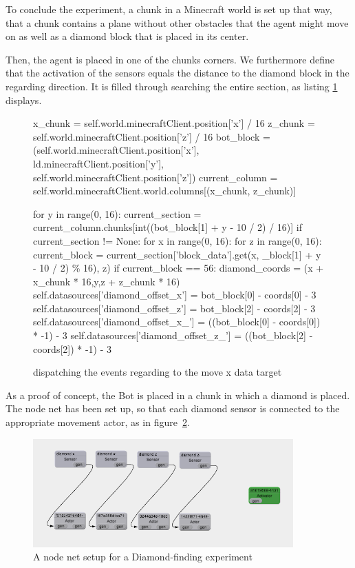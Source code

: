 To conclude the experiment, a chunk in a Minecraft world is set up that way, that a chunk contains a plane without other obstacles that the agent might move on as well as a diamond block that is placed in its center. 

Then, the agent is placed in one of the chunks corners. We furthermore define that the activation of the sensors equals the distance to the diamond block in the regarding direction. It is filled through searching the entire section, as listing \ref{listing_sensors} displays.

		\begin{figure}[ht]
			\centering
			\begin{minipage}{15cm}
				\begin{pseudocode}
x_chunk = self.world.minecraftClient.position['x'] / 16
z_chunk = self.world.minecraftClient.position['z'] / 16
bot_block = (self.world.minecraftClient.position['x'], ld.minecraftClient.position['y'], self.world.minecraftClient.position['z'])
current_column = self.world.minecraftClient.world.columns[(x_chunk, z_chunk)]

for y in range(0, 16):
    current_section = current_column.chunks[int((bot_block[1] + y - 10 / 2) / 16)]
    if current_section != None:
        for x in range(0, 16):
            for z in range(0, 16):
                current_block = current_section['block_data'].get(x, _block[1] + y - 10 / 2) \% 16), z)
                if current_block == 56:
                    diamond_coords = (x + x_chunk * 16,y,z + z_chunk * 16)
                    self.datasources['diamond_offset_x'] = bot_block[0] - coords[0] - 3
                    self.datasources['diamond_offset_z'] = bot_block[2] - coords[2] - 3
                    self.datasources['diamond_offset_x_'] = ((bot_block[0] - coords[0]) * -1) - 3
                    self.datasources['diamond_offset_z_'] = ((bot_block[2] - coords[2]) * -1) - 3
			\end{pseudocode}
		\caption{dispatching the events regarding to the move x data target}
		\label{listing_sensors}
	\end{minipage}
\end{figure}
    
As a proof of concept, the Bot is placed in a chunk in which a diamond is placed. The node net has been set up, so that each diamond sensor is connected to the appropriate movement actor, as in figure~\ref{nodenet_setup}.

\begin{figure}[h]
  \centering
    \includegraphics[width=10cm]{graphics/nodenet_setup}
  \caption{A node net setup for a Diamond-finding experiment}
  \label{nodenet_setup}
\end{figure}

